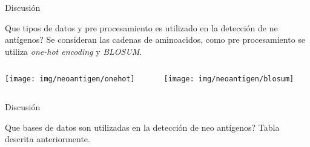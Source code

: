 \documentclass[10pt]{beamer}
\newcommand{\1}{
	\setbeamertemplate{background}{
		\texttt{[image: img/1]}
		\tikz[overlay] \fill[fill opacity=0.75,fill=white] (0,0) rectangle (-\paperwidth,\paperheight);
	}
}
\begin{document}
\begin{frame}{Discusión}{}
	\begin{block}{Que tipos de datos y pre procesamiento es utilizado en la detección de ne antígenos?}
		Se consideran las cadenas de aminoacidos, como pre procesamiento se utiliza \textit{one-hot encoding} y \textit{BLOSUM}.
	\end{block}
	
	\centering
\begin{columns}	
		
	\begin{column}{0.48\textwidth}
		\centering
		\texttt{[image: img/neoantigen/onehot]}
	\end{column}
	
	\begin{column}{0.48\textwidth}
		\centering
		\texttt{[image: img/neoantigen/blosum]}
	\end{column}
\end{columns}		
	

	
\end{frame}

\begin{frame}{Discusión}{}
	\begin{block}{Que bases de datos son utilizadas en la detección de neo antígenos?}
		Tabla descrita anteriormente.
	\end{block}	
\end{frame}
\end{document}
